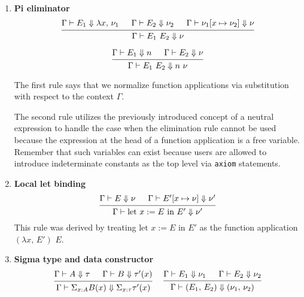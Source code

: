 \documentclass{article}
\begin{document}
\begin{enumerate}
\item \textbf{Pi eliminator} \\
  \[
    \begin{prooftree}
      \hypo{\Gamma \vdash E_1 \Downarrow \lambda x, \, \nu_1}
      \hypo{\Gamma \vdash E_2 \Downarrow \nu_2}
      \hypo{\Gamma \vdash \nu_1[x \mapsto \nu_2] \Downarrow \nu}
      \infer3{\Gamma \vdash E_1 \,\, E_2 \Downarrow \nu}
    \end{prooftree}
  \]

  \[
    \begin{prooftree}
      \hypo{\Gamma \vdash E_1 \Downarrow n}
      \hypo{\Gamma \vdash E_2 \Downarrow \nu}
      \infer2{\Gamma \vdash E_1 \,\, E_2 \Downarrow n \,\, \nu}
    \end{prooftree}
  \]

  The first rule says that we normalize function applications via
  substitution with respect to the context $\Gamma$.

  The second rule utilizes the previously introduced concept of a neutral
  expression to handle the case when the elimination rule cannot be used because
  the expression at the head of a function application is a free variable.
  Remember that such variables can exist because users are allowed to introduce
  indeterminate constants as the top level via \texttt{axiom} statements.

\item \textbf{Local let binding} \\
    \[
      \begin{prooftree}
        \hypo{\Gamma \vdash E \Downarrow \nu}
        \hypo{\Gamma \vdash E'[x \mapsto \nu] \Downarrow \nu'}
        \infer2{\Gamma \vdash \text{let } x := E \text{ in } E' \Downarrow \nu'}
      \end{prooftree}
    \]
    This rule was derived by treating $\text{let } x := E \text{ in } E'$ as
    the function application $(\lambda x, \, E') \,\, E$.

\item \textbf{Sigma type and data constructor} \\
    \begin{gather*}
      \begin{prooftree}
        \hypo{\Gamma \vdash A \Downarrow \tau}
        \hypo{\Gamma \vdash B \Downarrow \tau'(x)}
        \infer2{\Gamma \vdash \Sigma_{x : A}B(x) \Downarrow \Sigma_{x : \tau}\tau'(x)}
      \end{prooftree}
      ~ \quad
      \begin{prooftree}
        \hypo{\Gamma \vdash E_1 \Downarrow \nu_1}
        \hypo{\Gamma \vdash E_2 \Downarrow \nu_2}
        \infer2{\Gamma \vdash (E_1, \, E_2) \Downarrow (\nu_1, \, \nu_2)}
      \end{prooftree}
    \end{gather*}


\end{enumerate}
\end{document}
